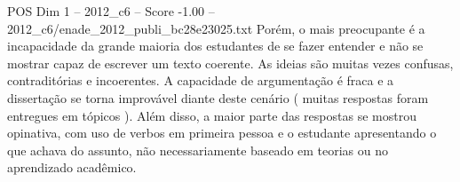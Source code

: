 \begin{textsample}{POS Dim 1 – 2012\_c6 – Score -1.00 – 2012\_c6/enade\_2012\_publi\_bc28e23025.txt}
Porém, o mais preocupante é a incapacidade da grande maioria dos estudantes de se fazer entender e não se mostrar capaz de escrever um texto coerente.
As ideias são muitas vezes confusas, contraditórias e incoerentes.
A capacidade de argumentação é fraca e a dissertação se torna improvável diante deste cenário ( muitas respostas foram entregues em tópicos ).
Além disso, a maior parte das respostas se mostrou opinativa, com uso de verbos em primeira pessoa e o estudante apresentando o que achava do assunto, não necessariamente baseado em teorias ou no aprendizado acadêmico.

\end{textsample}
